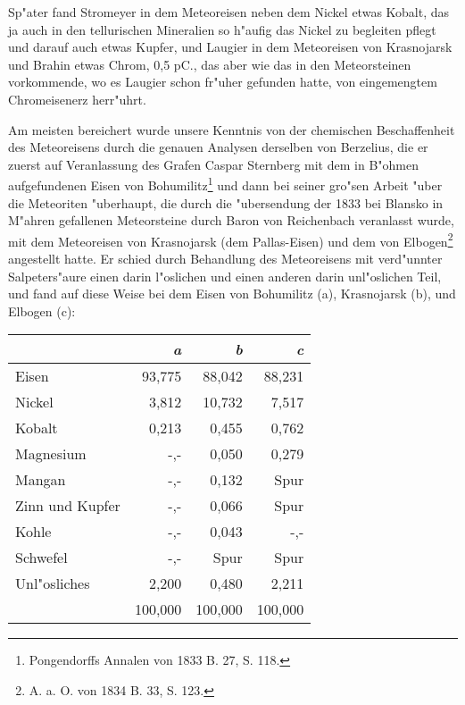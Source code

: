 \documentclass[a4paper, 11pt, oneside, german]{article}
\begin{document}
Sp"ater fand Stromeyer in dem Meteoreisen neben dem Nickel etwas Kobalt, das ja auch in den tellurischen Mineralien so h"aufig das Nickel zu begleiten pflegt und darauf auch etwas Kupfer, und Laugier in dem Meteoreisen von Krasnojarsk und Brahin etwas Chrom, 0,5 pC., das aber wie das in den Meteorsteinen vorkommende, wo es Laugier schon fr"uher gefunden hatte, von eingemengtem Chromeisenerz herr"uhrt.

Am meisten bereichert wurde unsere Kenntnis von der chemischen Beschaffenheit des Meteoreisens durch die genauen Analysen derselben von Berzelius, die er zuerst auf Veranlassung des Grafen Caspar Sternberg mit dem in B"ohmen aufgefundenen Eisen von Bohumilitz\footnote{Pongendorffs Annalen von 1833 B. 27, S. 118.} und dann bei seiner gro"sen Arbeit "uber die Meteoriten "uberhaupt, die durch die "ubersendung der 1833 bei Blansko in M"ahren gefallenen Meteorsteine durch Baron von Reichenbach veranlasst wurde, mit dem Meteoreisen von Krasnojarsk (dem Pallas-Eisen) und dem von Elbogen\footnote{A. a. O. von 1834 B. 33, S. 123.} angestellt hatte. Er schied durch Behandlung des Meteoreisens mit verd"unnter Salpeters"aure einen darin l"oslichen und einen anderen darin unl"oslichen Teil, und fand auf diese Weise bei dem Eisen von Bohumilitz (a), Krasnojarsk (b), und Elbogen (c):
\begin{center}
\begin{tabular}{ |l|r|r|r| }
    \hline
     & \emph{a} & \emph{b} & \emph{c}\\
    \hline\hline
    Eisen & 93,775 & 88,042 & 88,231\\\hline
    Nickel & 3,812 & 10,732 & 7,517\\\hline
    Kobalt & 0,213 & 0,455 & 0,762\\\hline
    Magnesium & -,- & 0,050 & 0,279\\\hline
    Mangan & -,- & 0,132 & Spur\\\hline
    Zinn und Kupfer & -,- & 0,066 & Spur\\\hline
    Kohle & -,- & 0,043 & -,-\\\hline
    Schwefel & -,- & Spur & Spur\\\hline
    Unl"osliches & 2,200 & 0,480 & 2,211\\\hline
    & 100,000 & 100,000 & 100,000\\
    \hline
\end{tabular}
\end{center}
\end{document}
